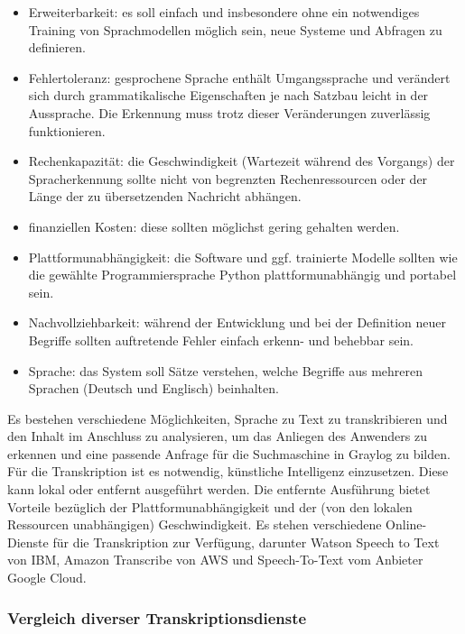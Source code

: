 \begin{itemize}
\item Erweiterbarkeit: es soll einfach und insbesondere ohne ein notwendiges Training von Sprachmodellen möglich sein, neue Systeme und Abfragen zu definieren.
\item Fehlertoleranz: gesprochene Sprache enthält Umgangssprache und verändert sich durch grammatikalische Eigenschaften je nach Satzbau leicht in der Aussprache. Die Erkennung muss trotz dieser Veränderungen zuverlässig funktionieren.
\item Rechenkapazität: die Geschwindigkeit (Wartezeit während des Vorgangs) der Spracherkennung sollte nicht von begrenzten Rechenressourcen oder der Länge der zu übersetzenden Nachricht abhängen.
\item finanziellen Kosten: diese sollten möglichst gering gehalten werden.
\item Plattformunabhängigkeit: die Software und ggf. trainierte Modelle sollten wie die gewählte Programmiersprache Python plattformunabhängig und portabel sein.
\item Nachvollziehbarkeit: während der Entwicklung und bei der Definition neuer Begriffe sollten auftretende Fehler einfach erkenn- und behebbar sein.
\item Sprache: das System soll Sätze verstehen, welche Begriffe aus mehreren Sprachen (Deutsch und Englisch) beinhalten.
\end{itemize}

Es bestehen verschiedene Möglichkeiten, Sprache zu Text zu transkribieren und den Inhalt im Anschluss zu analysieren, um das Anliegen des Anwenders zu erkennen und eine passende Anfrage für die Suchmaschine in Graylog zu bilden. Für die Transkription ist es notwendig, künstliche Intelligenz einzusetzen. Diese kann lokal oder entfernt ausgeführt werden. Die entfernte Ausführung bietet Vorteile bezüglich der Plattformunabhängigkeit und der (von den lokalen Ressourcen unabhängigen) Geschwindigkeit. Es stehen verschiedene Online-Dienste für die Transkription zur Verfügung, darunter Watson Speech to Text von IBM, Amazon Transcribe von AWS und Speech-To-Text vom Anbieter Google Cloud. 

\subsubsection{Vergleich diverser Transkriptionsdienste}
\label{sec:vergleich-transkrip}

